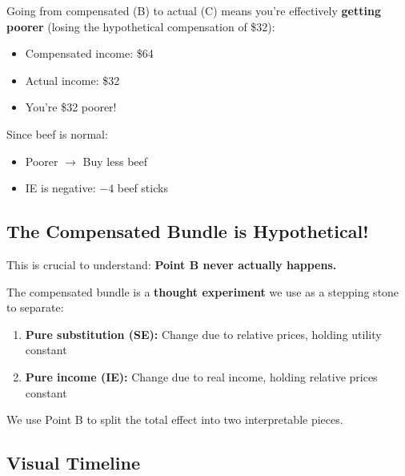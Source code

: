 \documentclass[11pt]{article}
\begin{document}
Going from compensated (B) to actual (C) means you're effectively \textbf{getting poorer} (losing the hypothetical compensation of \$32):
\begin{itemize}
    \item Compensated income: \$64
    \item Actual income: \$32
    \item You're \$32 poorer!
\end{itemize}

Since beef is normal:
\begin{itemize}
    \item Poorer $\to$ Buy less beef
    \item IE is negative: $-4$ beef sticks
\end{itemize}

\subsection{The Compensated Bundle is Hypothetical!}

This is crucial to understand: \textbf{Point B never actually happens.}

The compensated bundle is a \textbf{thought experiment} we use as a stepping stone to separate:
\begin{enumerate}
    \item \textbf{Pure substitution (SE):} Change due to relative prices, holding utility constant
    \item \textbf{Pure income (IE):} Change due to real income, holding relative prices constant
\end{enumerate}

We use Point B to split the total effect into two interpretable pieces.

\subsection{Visual Timeline}
\end{document}
